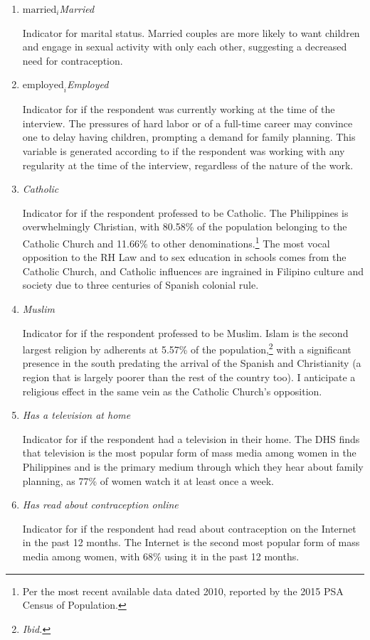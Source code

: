 \documentclass[12pt]{article}
\newcommand{\married}{%
    \ifmmode\ensuremath{\textrm{married}_i}\else\textit{Married}\fi
}
\newcommand{\employed}{%
    \ifmmode\ensuremath{\textrm{employed}_i}\else\textit{Employed}\fi
}
\newcommand{\catholic}{\textit{Catholic}}
\newcommand{\muslim}{\textit{Muslim}}
\newcommand{\television}{\textit{Has a television at home}}
\newcommand{\readonline}{\textit{Has read about contraception online}}
\begin{document}
\begin{enumerate}
        \item \married{}
        
        Indicator for marital status.
        Married couples are more likely to want children and engage in sexual activity with only each other, suggesting a decreased need for contraception.

        \item \employed{}

        Indicator for if the respondent was currently working at the time of the interview.
        The pressures of hard labor or of a full-time career may convince one to delay having children, prompting a demand for family planning.
        This variable is generated according to if the respondent was working with any regularity at the time of the interview, regardless of the nature of the work.
    
        \item \catholic{}
        
        Indicator for if the respondent professed to be Catholic.
        The Philippines is overwhelmingly Christian, with 80.58\% of the population belonging to the Catholic Church and 11.66\% to other
        denominations.\footnote{
            Per the most recent available data dated 2010, reported by the 2015 PSA Census of Population.
        }
        The most vocal opposition to the RH Law and to sex education in schools comes from the Catholic Church, and Catholic influences are ingrained in Filipino culture and society due to three centuries of Spanish colonial rule.
    
        \item \muslim{}
        
        Indicator for if the respondent professed to be Muslim. 
        Islam is the second largest religion by adherents at 5.57\% of the population,\footnote{
            \textit{Ibid.}    
        }
        with a significant presence in the south predating
        the arrival of the Spanish and Christianity (a region that is largely poorer than the rest of the country too).
        I anticipate a religious effect in the same vein as the
        Catholic Church's opposition.

        \item \television{}

        Indicator for if the respondent had a television in their home. 
        The DHS finds that television is the most popular form of mass media among women in the Philippines and is the primary medium through which they hear about family planning, as 77\% of women watch it at least once a week.
    
        \item \readonline{}

        Indicator for if the respondent had read about contraception on
        the Internet in the past 12 months.
        The Internet is the second most popular form of mass media among
        women, with 68\% using it in the past 12 months.
    \end{enumerate}
\end{document}
